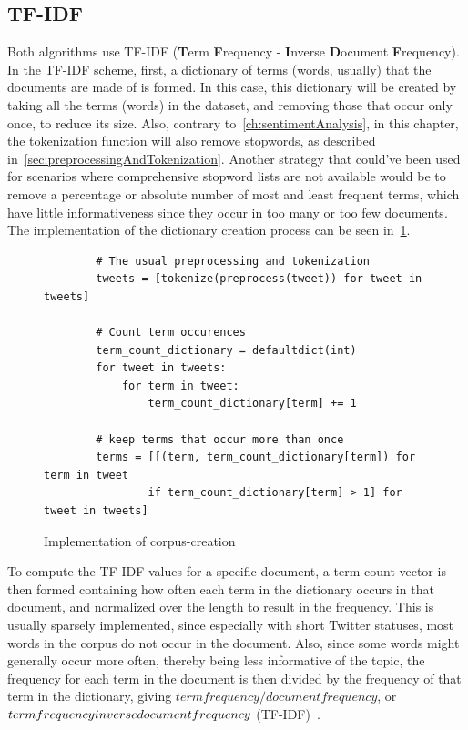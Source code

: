\subsection{TF-IDF}
\label{subsec:tfidf}

Both algorithms use TF-IDF (\textbf{T}erm \textbf{F}requency - \textbf{I}nverse \textbf{D}ocument \textbf{F}requency).
In the TF-IDF scheme, first, a dictionary of terms (words, usually) that the documents are made of is formed.
In this case, this dictionary will be created by taking all the terms (words) in the dataset,
and removing those that occur only once, to reduce its size.
Also, contrary to~\cref{ch:sentimentAnalysis}, in this chapter,
the tokenization function will also remove stopwords, as described in~\cref{sec:preprocessingAndTokenization}.
Another strategy that could've been used for scenarios where comprehensive stopword lists are not available
would be to remove a percentage or absolute number of most and least frequent terms,
which have little informativeness since they occur in too many or too few documents.
The implementation of the dictionary creation process can be seen in~\cref{code:create_corpus}.

\begin{figure}
    \caption{Implementation of corpus-creation}
    \label{code:create_corpus}
    \begin{verbatim}
        # The usual preprocessing and tokenization
        tweets = [tokenize(preprocess(tweet)) for tweet in tweets]

        # Count term occurences
        term_count_dictionary = defaultdict(int)
        for tweet in tweets:
            for term in tweet:
                term_count_dictionary[term] += 1

        # keep terms that occur more than once
        terms = [[(term, term_count_dictionary[term]) for term in tweet
                if term_count_dictionary[term] > 1] for tweet in tweets]
    \end{verbatim}
\end{figure}

To compute the TF-IDF values for a specific document,
a term count vector is then formed containing how often each term in the dictionary occurs in that document,
and normalized over the length to result in the frequency.
This is usually sparsely implemented, since especially with short Twitter statuses,
most words in the corpus do not occur in the document.
Also, since some words might generally occur more often, thereby being less informative of the topic,
the frequency for each term in the document is then divided by the frequency of that term in the dictionary,
giving $term frequency / document frequency$, or $term frequency \* inverse document frequency$ (TF-IDF)~\cite{Blei2003}.

